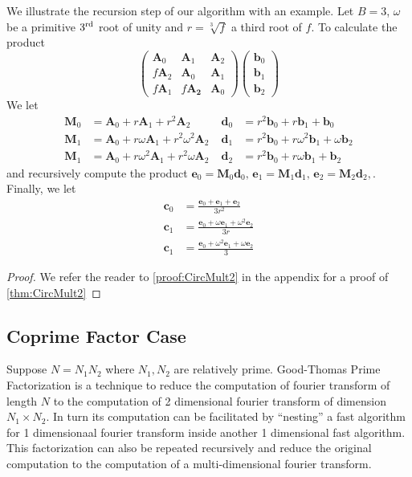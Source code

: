 \begin{example}
    We illustrate the recursion step of our algorithm with an example. Let \(B=3\), \(\omega\) be a primitive \(3\textsuperscript{rd}\) root of unity and \(r = \sqrt[3]{f}\) a third root of \(f\). To calculate the product
    \[\begin{pmatrix}
        \bm{A}_0 & \bm{A}_1 & \bm{A}_2 \\
        f \bm{A}_2 & \bm{A}_0 & \bm{A}_1 \\
        f \bm{A}_1 & f \bm{A_2} & \bm{A}_0
    \end{pmatrix} \begin{pmatrix}
        \bm{b}_0 \\ \bm{b}_1 \\ \bm{b}_2
    \end{pmatrix}\]
    We let
    \begin{align*}
        \bm{M}_0 &= \bm{A}_0 + r \bm{A}_1 + r^2 \bm{A}_2 \; & \bm{d}_0 &= r^2 \bm{b}_0 + r \bm{b}_1 + \bm{b}_0 \\
        \bm{M}_1 &= \bm{A}_0 + r \omega \bm{A}_1 + r^2 \omega^2 \bm{A}_2 \; & \bm{d}_1 &= r^2 \bm{b}_0 + r \omega^2 \bm{b}_1 + \omega \bm{b}_2 \\
        \bm{M}_1 &= \bm{A}_0 + r \omega^2 \bm{A}_1 + r^2 \omega \bm{A}_2 \; & \bm{d}_2 &= r^2 \bm{b}_0 + r \omega \bm{b}_1 + \bm{b}_2
    \end{align*}
    and recursively compute the product \(\bm{e}_0 = \bm{M}_0 \bm{d}_0,\, \bm{e}_1 = \bm{M}_1 \bm{d}_1,\, \bm{e}_2 = \bm{M}_2 \bm{d}_2,\). Finally, we let
    \begin{align*}
        \bm{c}_0 &= \frac{\bm{e}_0 + \bm{e}_1 + \bm{e}_2}{3r^2} \\
        \bm{c}_1 &= \frac{\bm{e}_0 + \omega \bm{e}_1 + \omega^2 \bm{e}_2}{3r} \\
        \bm{c}_1 &= \frac{\bm{e}_0 + \omega^2 \bm{e}_1 + \omega \bm{e}_2}{3}
    \end{align*}
\end{example}
\else
\begin{proof}
    We refer the reader to \cref{proof:CircMult2} in the appendix for a proof of \cref{thm:CircMult2}
\end{proof}
\fi

\subsection{Coprime Factor Case}
Suppose \(N = N_1 N_2\) where \(N_1, N_2\) are relatively prime. Good-Thomas Prime Factorization \cite{JRSS:Good58,ADC:Thomas63} is a technique to reduce the computation of fourier transform of length \(N\) to the computation of 2 dimensional fourier transform of dimension \(N_1 \times N_2\). In turn its computation can be facilitated by ``nesting'' a fast algorithm for 1 dimensionaal fourier transform inside another 1 dimensional fast algorithm. This factorization can also be repeated recursively and reduce the original computation to the computation of a multi-dimensional fourier transform.

